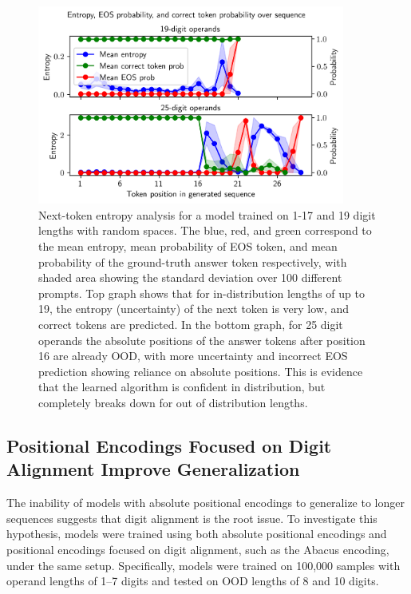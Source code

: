 \begin{figure}[!h]
  \centering
  \includegraphics[width=0.9\textwidth]{fig/next_token_entropy.png}
  \caption{Next-token entropy analysis for a model trained on 1-17 and 19 digit lengths with random spaces. The blue, red, and green correspond to the mean entropy, mean probability of EOS token, and mean probability of the ground-truth answer token respectively, with shaded area showing the standard deviation over 100 different prompts. Top graph shows that for in-distribution lengths of up to 19, the entropy (uncertainty) of the next token is very low, and correct tokens are predicted. In the bottom graph, for 25 digit operands the absolute positions of the answer tokens after position 16 are already OOD, with more uncertainty and incorrect EOS prediction showing reliance on absolute positions. This is evidence that the learned algorithm is confident in distribution, but completely breaks down for out of distribution lengths.}
  \label{fig:next_token_entropy}
\end{figure}

\subsection{Positional Encodings Focused on Digit Alignment Improve Generalization}\label{subsec:digit_alignment_pe}

The inability of models with absolute positional encodings to generalize to longer sequences suggests that digit alignment is the root issue. To investigate this hypothesis, models were trained using both absolute positional encodings and positional encodings focused on digit alignment, such as the Abacus encoding, under the same setup. Specifically, models were trained on 100,000 samples with operand lengths of 1--7 digits and tested on OOD lengths of 8 and 10 digits.

